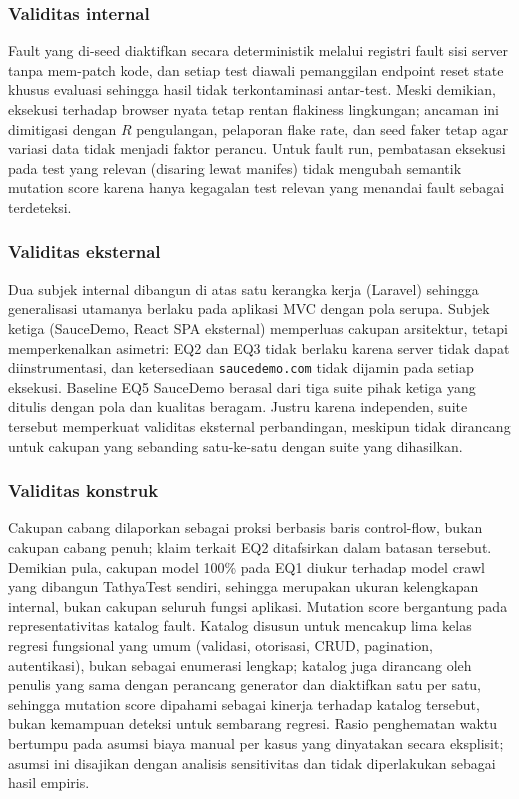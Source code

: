 \documentclass[conference]{IEEEtran}
\begin{document}
\subsubsection{Validitas internal}
Fault yang di-seed diaktifkan secara deterministik melalui registri fault sisi server tanpa mem-patch kode, dan setiap test diawali pemanggilan endpoint reset state khusus evaluasi sehingga hasil tidak terkontaminasi antar-test. Meski demikian, eksekusi terhadap browser nyata tetap rentan flakiness lingkungan; ancaman ini dimitigasi dengan $R$ pengulangan, pelaporan flake rate, dan seed faker tetap agar variasi data tidak menjadi faktor perancu. Untuk fault run, pembatasan eksekusi pada test yang relevan (disaring lewat manifes) tidak mengubah semantik mutation score karena hanya kegagalan test relevan yang menandai fault sebagai terdeteksi.

\subsubsection{Validitas eksternal}
Dua subjek internal dibangun di atas satu kerangka kerja (Laravel) sehingga generalisasi utamanya berlaku pada aplikasi MVC dengan pola serupa. Subjek ketiga (SauceDemo, React SPA eksternal) memperluas cakupan arsitektur, tetapi memperkenalkan asimetri: EQ2 dan EQ3 tidak berlaku karena server tidak dapat diinstrumentasi, dan ketersediaan \texttt{saucedemo.com} tidak dijamin pada setiap eksekusi. Baseline EQ5 SauceDemo berasal dari tiga suite pihak ketiga yang ditulis dengan pola dan kualitas beragam. Justru karena independen, suite tersebut memperkuat validitas eksternal perbandingan, meskipun tidak dirancang untuk cakupan yang sebanding satu-ke-satu dengan suite yang dihasilkan.

\subsubsection{Validitas konstruk}
Cakupan cabang dilaporkan sebagai proksi berbasis baris control-flow, bukan cakupan cabang penuh; klaim terkait EQ2 ditafsirkan dalam batasan tersebut. Demikian pula, cakupan model 100\% pada EQ1 diukur terhadap model crawl yang dibangun TathyaTest sendiri, sehingga merupakan ukuran kelengkapan internal, bukan cakupan seluruh fungsi aplikasi. Mutation score bergantung pada representativitas katalog fault. Katalog disusun untuk mencakup lima kelas regresi fungsional yang umum (validasi, otorisasi, CRUD, pagination, autentikasi), bukan sebagai enumerasi lengkap; katalog juga dirancang oleh penulis yang sama dengan perancang generator dan diaktifkan satu per satu, sehingga mutation score \evBladeMutScore{} dipahami sebagai kinerja terhadap katalog tersebut, bukan kemampuan deteksi untuk sembarang regresi. Rasio penghematan waktu bertumpu pada asumsi biaya manual per kasus yang dinyatakan secara eksplisit; asumsi ini disajikan dengan analisis sensitivitas dan tidak diperlakukan sebagai hasil empiris.
\end{document}

